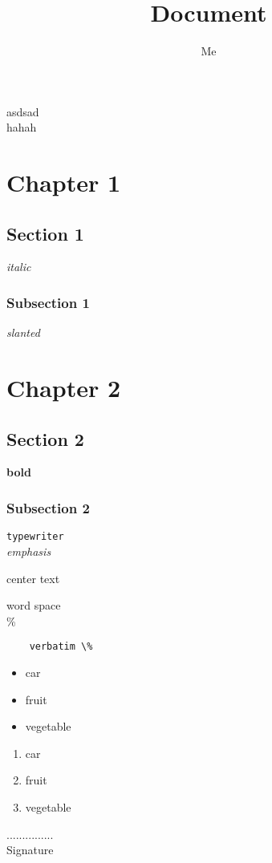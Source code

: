 \documentclass[12pt]{report}
\title{Document}
\author{Me}
\begin{document}
\tableofcontents
\maketitle
asdsad\\hahah
\chapter*{Chapter 1}
\section*{Section 1}
	\textit{italic}\\
\subsection*{Subsection 1}
	\textsl{slanted}\\
\chapter{Chapter 2}
\section{Section 2}
	\textbf{bold}\\
\subsection{Subsection 2}
	\texttt{typewriter}\\
	\emph{emphasis}\\
\begin{center}
	center text
\end{center}
\newpage
word \quad \quad space\\
\%
\begin{verbatim}
	verbatim \%
\end{verbatim}
\begin{itemize}
	\item car
	\item fruit
	\item vegetable
\end{itemize}
\begin{enumerate}
	\item car
	\item fruit
	\item vegetable
\end{enumerate}
\begin{flushright}
	...............\\
	Signature
\end{flushright}
\end{document}
